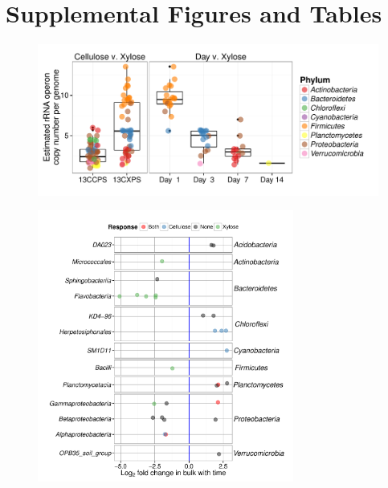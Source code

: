 \thispagestyle{empty}


\section{Supplemental Figures and Tables}


\begin{figure}[H]
	\begin{center}
	\centerline{\includegraphics[width=\textwidth]{figures/copy_number/copy_number.pdf}}
	\caption{\protect}\label{fig:copy}
        \end{center}
\end{figure}

\begin{figure}[H] \begin{center}
\centerline{\includegraphics[width=0.75\textwidth]{figures/l2fc_time/l2fc_time.pdf}}
\caption{\protect}\label{fig:time}
\end{center} \end{figure}

